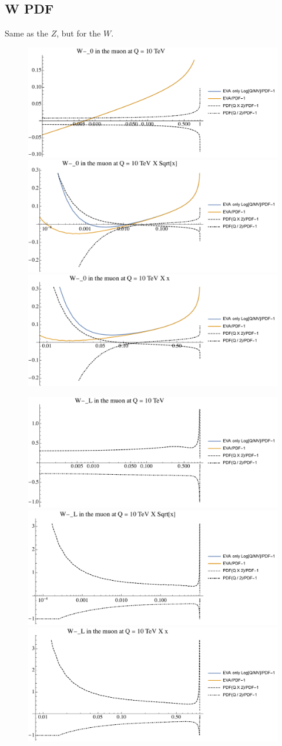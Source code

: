 \documentclass[a4paper,11pt]{article}
\begin{document}
\clearpage
\pagebreak

\subsection{W PDF}
\label{app:PDFsEVA_W}

Same as the $Z$, but for the $W$.


\begin{figure}[!b]
\includegraphics[width=0.46\linewidth]{Notebooks/PlotPDFs/ratios/10TeV/W-_0_Q.pdf}
\includegraphics[width=0.46\linewidth]{Notebooks/PlotPDFs/ratios/10TeV/W-_0_Qsqrtx.pdf}
\includegraphics[width=0.46\linewidth]{Notebooks/PlotPDFs/ratios/10TeV/W-_0_Qx.pdf}
\end{figure}

\begin{figure}[!b]
\includegraphics[width=0.46\linewidth]{Notebooks/PlotPDFs/ratios/10TeV/W-_L_Q.pdf}
\includegraphics[width=0.46\linewidth]{Notebooks/PlotPDFs/ratios/10TeV/W-_L_Qsqrtx.pdf}
\includegraphics[width=0.46\linewidth]{Notebooks/PlotPDFs/ratios/10TeV/W-_L_Qx.pdf}
\end{figure}
\end{document}
